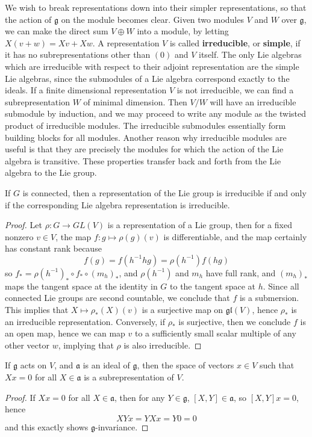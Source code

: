 We wish to break representations down into their simpler representations, so that the action of $\mathfrak{g}$ on the module becomes clear. Given two modules $V$ and $W$ over $\mathfrak{g}$, we can make the direct sum $V \oplus W$ into a module, by letting $X(v + w) = Xv + Xw$. A representation $V$ is called {\bf irreducible}, or {\bf simple}, if it has no subrepresentations other than $(0)$ and $V$ itself. The only Lie algebras which are irreducible with respect to their adjoint representation are the simple Lie algebras, since the submodules of a Lie algebra correspond exactly to the ideals. If a finite dimensional representation $V$ is not irreducible, we can find a subrepresentation $W$ of minimal dimension. Then $V/W$ will have an irreducible submodule by induction, and we may proceed to write any module as the twisted product of irreducible modules. The irreducible submodules essentially form building blocks for all modules. Another reason why irreducible modules are useful is that they are precisely the modules for which the action of the Lie algebra is transitive. These properties transfer back and forth from the Lie algebra to the Lie group.

\begin{lemma}
    If $G$ is connected, then a representation of the Lie group is irreducible if and only if the corresponding Lie algebra representation is irreducible.
\end{lemma}
\begin{proof}
    Let $\rho: G \to GL(V)$ is a representation of a Lie group, then for a fixed nonzero $v \in V$, the map $f: g \mapsto \rho(g)(v)$ is differentiable, and the map certainly has constant rank because
    \[ f(g) = f(h^{-1}hg) = \rho(h^{-1})f(hg) \]
    so $f_* = \rho(h^{-1})_* \circ f_* \circ (m_h)_*$, and $\rho(h^{-1})$ and $m_h$ have full rank, and $(m_h)_*$ maps the tangent space at the identity in $G$ to the tangent space at $h$. Since all connected Lie groups are second countable, we conclude that $f$ is a submersion. This implies that $X \mapsto \rho_*(X)(v)$ is a surjective map on $\mathfrak{gl}(V)$, hence $\rho_*$ is an irreducible representation. Conversely, if $\rho_*$ is surjective, then we conclude $f$ is an open map, hence we can map $v$ to a sufficiently small scalar multiple of any other vector $w$, implying that $\rho$ is also irreducible.
\end{proof}

\begin{lemma}
    If $\mathfrak{g}$ acts on $V$, and $\mathfrak{a}$ is an ideal of $\mathfrak{g}$, then the space of vectors $x \in V$ such that $Xx = 0$ for all $X \in \mathfrak{a}$ is a subrepresentation of $V$.
\end{lemma}
\begin{proof}
    If $Xx = 0$ for all $X \in \mathfrak{a}$, then for any $Y \in \mathfrak{g}$, $[X,Y] \in \mathfrak{a}$, so $[X,Y]x = 0$, hence
    \[ XYx = YXx = Y0 = 0 \]
    and this exactly shows $\mathfrak{g}$-invariance.
\end{proof}

